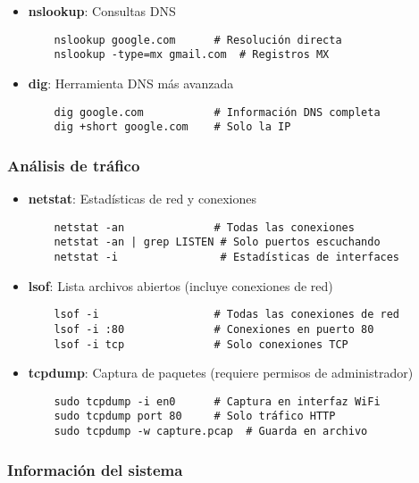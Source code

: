 \begin{itemize}
\begin{itemize}
    \item \textbf{nslookup}: Consultas DNS
    \begin{verbatim}
    nslookup google.com      # Resolución directa
    nslookup -type=mx gmail.com  # Registros MX
    \end{verbatim}
    
    \item \textbf{dig}: Herramienta DNS más avanzada
    \begin{verbatim}
    dig google.com           # Información DNS completa
    dig +short google.com    # Solo la IP
    \end{verbatim}
\end{itemize}

\subsubsection{Análisis de tráfico}

\begin{itemize}
    \item \textbf{netstat}: Estadísticas de red y conexiones
    \begin{verbatim}
    netstat -an              # Todas las conexiones
    netstat -an | grep LISTEN # Solo puertos escuchando
    netstat -i                # Estadísticas de interfaces
    \end{verbatim}
    
    \item \textbf{lsof}: Lista archivos abiertos (incluye conexiones de red)
    \begin{verbatim}
    lsof -i                  # Todas las conexiones de red
    lsof -i :80              # Conexiones en puerto 80
    lsof -i tcp              # Solo conexiones TCP
    \end{verbatim}
    
    \item \textbf{tcpdump}: Captura de paquetes (requiere permisos de administrador)
    \begin{verbatim}
    sudo tcpdump -i en0      # Captura en interfaz WiFi
    sudo tcpdump port 80     # Solo tráfico HTTP
    sudo tcpdump -w capture.pcap  # Guarda en archivo
    \end{verbatim}
\end{itemize}

\subsubsection{Información del sistema}


\end{itemize}
